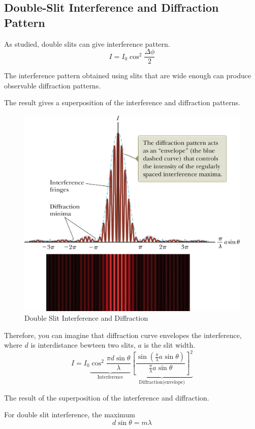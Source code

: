 \documentclass[openany]{book}
\begin{document}
\subsection{Double-Slit Interference and Diffraction Pattern}
As studied, double slits can give interference pattern.
\[I=I_0\cos ^2\frac{\Delta \phi}{2}\]

The interference pattern obtained using slits that are wide enough can produce observable diffraction patterns.

The result gives a superposition of the interference and diffraction patterns.

\begin{figure}[H]
\centering
\label{fig:double slit interference1}
\includegraphics[scale=0.15]{Figure/26.PNG}
\caption{Double Slit Interference and Diffraction}
\end{figure}

Therefore, you can imagine that diffraction curve envelopes the interference, where $d$ is interdistance bewteen two slits, $a$ is the slit width.
\[I=I_0\underbrace{\cos ^2\frac{\pi d\sin \theta}{\lambda }}_\text{Interference}\underbrace{\left[\frac{\sin \left(\frac{\pi }{\lambda }a\sin \theta\right)}{\frac{\pi }{\lambda }a\sin \theta}\right]^2}_\text{Diffraction(envelope)}\]

The result of the superposition of the interference and diffraction.

For double slit interference, the maximum
\[d\sin \theta=m\lambda \]
\end{document}
